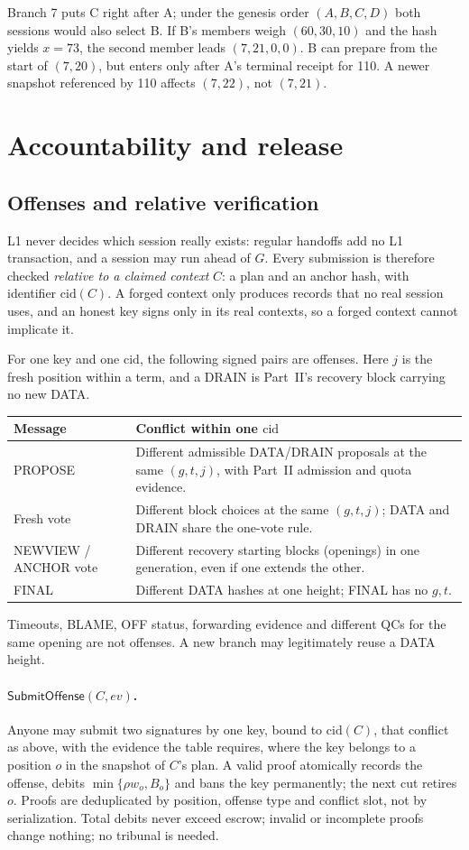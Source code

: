 \documentclass[11pt,a4paper]{article}
\newcommand{\tagg}[1]{\mathsf{#1}}
\newcommand{\cid}{\mathrm{cid}}
\begin{document}
Branch 7 puts C right after A; under the genesis order $(A,B,C,D)$ both
sessions would also select B. If B's members weigh $(60,30,10)$ and the hash yields $x=73$, the
second member leads $(7,21,0,0)$. B can prepare from the start of
$(7,20)$, but enters only after A's terminal receipt for 110. A newer
snapshot referenced by 110 affects $(7,22)$, not $(7,21)$.

\section{Accountability and release}
\label{sec:account}
\subsection{Offenses and relative verification}
L1 never decides which session really exists: regular handoffs add no L1
transaction, and a session may run ahead of $G$. Every submission is
therefore checked \emph{relative to a claimed context} $C$: a plan and an
anchor hash, with identifier $\cid(C)$. A forged context only produces
records that no real session uses, and an honest key signs only in its
real contexts, so a forged context cannot implicate it.

For one key and one $\cid$, the following signed pairs are offenses. Here
$j$ is the fresh position within a term, and a DRAIN is Part~II's recovery
block carrying no new DATA.

\begin{tabularx}{\linewidth}{@{}>{\raggedright\arraybackslash}p{.24\linewidth}Y@{}}\toprule
Message & Conflict within one $\cid$\\\midrule
PROPOSE & Different admissible DATA/DRAIN proposals at the same $(g,t,j)$,
with Part~II admission and quota evidence.\\
Fresh vote & Different block choices at the same $(g,t,j)$; DATA and DRAIN
share the one-vote rule.\\
NEWVIEW / ANCHOR vote & Different recovery starting blocks (openings)
in one generation, even if one extends the other.\\
FINAL & Different DATA hashes at one height; FINAL has no $g,t$.\\\bottomrule
\end{tabularx}

Timeouts, BLAME, OFF status, forwarding evidence and different QCs for the
same opening are not offenses. A new branch may legitimately reuse a DATA
height.

\paragraph{$\tagg{SubmitOffense}(C,\mathit{ev})$.} Anyone may submit two
signatures by one key, bound to $\cid(C)$, that conflict as above, with the
evidence the table requires, where the key belongs to a position $o$ in
the snapshot of $C$'s plan. A valid proof atomically records the offense,
debits $\min\{\rho w_o,B_o\}$ and bans the key permanently; the next cut
retires $o$. Proofs are deduplicated by position, offense type and
conflict slot, not by serialization. Total debits never exceed escrow;
invalid or incomplete proofs change nothing; no tribunal is needed.
\end{document}
